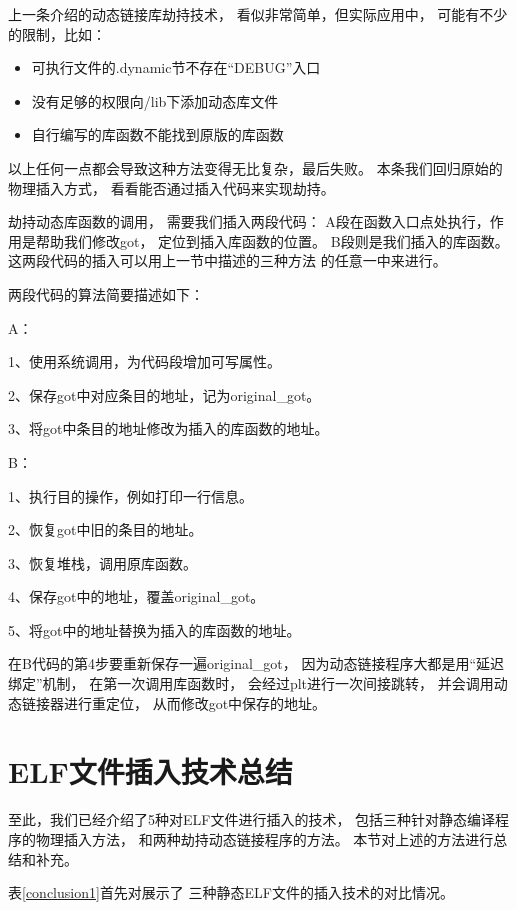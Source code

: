 上一条介绍的动态链接库劫持技术，
看似非常简单，但实际应用中，
可能有不少的限制，比如：

\begin{itemize}
  \item 可执行文件的.dynamic节不存在“DEBUG”入口
  \item 没有足够的权限向/lib下添加动态库文件
  \item 自行编写的库函数不能找到原版的库函数 
\end{itemize}

以上任何一点都会导致这种方法变得无比复杂，最后失败。
本条我们回归原始的物理插入方式，
看看能否通过插入代码来实现劫持。

劫持动态库函数的调用，
需要我们插入两段代码：
A段在函数入口点处执行，作用是帮助我们修改got，
定位到插入库函数的位置。
B段则是我们插入的库函数。
这两段代码的插入可以用上一节中描述的三种方法
的任意一中来进行。

两段代码的算法简要描述如下：

A：

1、使用系统调用，为代码段增加可写属性。

2、保存got中对应条目的地址，记为original\_got。

3、将got中条目的地址修改为插入的库函数的地址。

B：

1、执行目的操作，例如打印一行信息。

2、恢复got中旧的条目的地址。

3、恢复堆栈，调用原库函数。

4、保存got中的地址，覆盖original\_got。

5、将got中的地址替换为插入的库函数的地址。

在B代码的第4步要重新保存一遍original\_got，
因为动态链接程序大都是用“延迟绑定”机制，
在第一次调用库函数时，
会经过plt进行一次间接跳转，
并会调用动态链接器进行重定位，
从而修改got中保存的地址。


\section{ELF文件插入技术总结}

至此，我们已经介绍了5种对ELF文件进行插入的技术，
包括三种针对静态编译程序的物理插入方法，
和两种劫持动态链接程序的方法。
本节对上述的方法进行总结和补充。

表\ref{conclusion1}首先对展示了
三种静态ELF文件的插入技术的对比情况。

